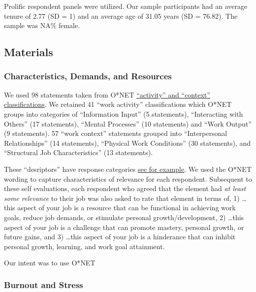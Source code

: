 \documentclass[
  english,
  man]{apa6}
\begin{document}
Prolific respondent panels were utilized. Our sample participants had an average tenure of 2.77 (SD = 1) and an average age of 31.05 years (SD = 76.82). The sample was NA\% female.

\hypertarget{materials}{%
\subsection{Materials}\label{materials}}

\hypertarget{characteristics-demands-and-resources}{%
\subsubsection{Characteristics, Demands, and Resources}\label{characteristics-demands-and-resources}}

We used 98 statements taken from O*NET \href{https://www.O*NETonline.org/find/descriptor/result/4.A.1.b.3}{``activity'' and ``context'' classifications}. We retained 41 ``work activity'' classifications which O*NET groups into categories of ``Information Input'' (5 statements), ``Interacting with Others'' (17 statements), ``Mental Processes'' (10 statements) and ``Work Output'' (9 statements). 57 ``work context'' statements grouped into ``Interpersonal Relationships'' (14 statements), ``Physical Work Conditions'' (30 statements), and ``Structural Job Characteristics'' (13 statements).

These ``desriptors'' have response categories \href{https://www.O*NETonline.org/find/descriptor/result/4.C.1.c.2}{see for example}. We used the O*NET wording to capture characteristics of relevance for each respondent. Subsequent to these self evaluations, each respondent who agreed that the element had \emph{at least some relevance} to their job was also asked to rate that element in terms of, 1) \ldots this aspect of your job is a resource that can be functional in achieving work goals, reduce job demands, or stimulate personal growth/development, 2) \ldots this aspect of your job is a challenge that can promote mastery, personal growth, or future gains, and 3) \ldots this aspect of your job is a hinderance that can inhibit personal growth, learning, and work goal attainment.

Our intent was to use O*NET

\hypertarget{burnout-and-stress}{%
\subsubsection{Burnout and Stress}\label{burnout-and-stress}}
\end{document}

